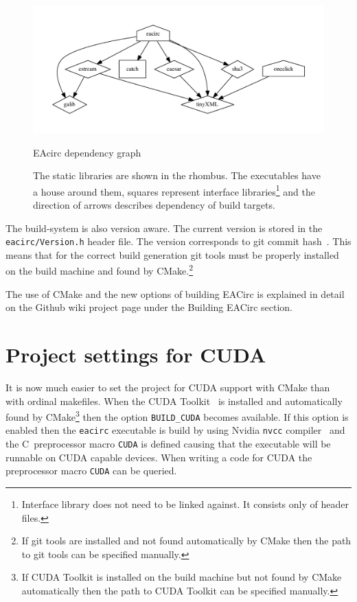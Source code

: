 \documentclass[12pt,oneside]{fithesis2}
\begin{document}
\begin{figure}[h]
	\begin{center}
		\includegraphics[width=.8\textwidth]{figures/deps}
	\end{center}
	\caption{EAcirc dependency graph}
	\label{fig:deps}
	\caption*{The static libraries are shown in the rhombus. The executables have a house around them, squares represent interface libraries\footnote{Interface library does not need to be linked against. It consists only of header files.} and the direction of arrows describes dependency of build targets.}
\end{figure}

The build-system is also version aware. The current version is stored in the \texttt{eacirc/Version.h} header file. The version corresponds to git commit hash~\cite{git_book}. This means that for the correct build generation git tools must be properly installed on the build machine and found by CMake.\footnote{If git tools are installed and not found automatically by CMake then the path to git tools can be specified manually.}

The use of CMake and the new options of building EACirc is explained in detail on the Github wiki project page under the Building EACirc section.

\section{Project settings for CUDA}

It is now much easier to set the project for CUDA support with CMake than with ordinal makefiles. When the CUDA Toolkit~\cite{cuda_toolkit} is installed and automatically found by CMake\footnote{If CUDA Toolkit is installed on the build machine but not found by CMake automatically then the path to CUDA Toolkit can be specified manually.} then the option \texttt{BUILD\_CUDA} becomes available. If this option is enabled then the \texttt{eacirc} executable is build by using Nvidia \texttt{nvcc} compiler~\cite{cuda_compiler} and the C~preprocessor macro \texttt{CUDA} is defined causing that the executable will be runnable on CUDA capable devices. When writing a code for CUDA the preprocessor macro \texttt{CUDA} can be queried.
\end{document}

